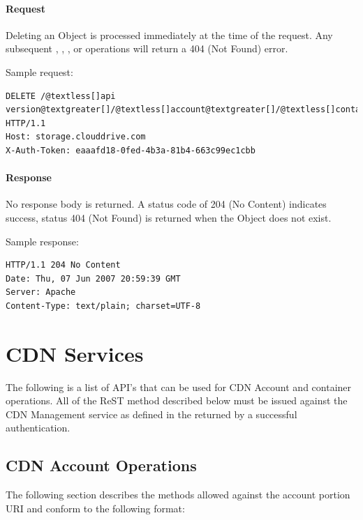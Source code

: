 \documentclass[letterpaper,10pt,english]{manual}
\begin{document}
\paragraph{Request}

Deleting an Object is processed immediately at the time of the request.
Any subsequent , , , or  operations will
return a 404 (Not Found) error.

Sample request:

\begin{Verbatim}[commandchars=@\[\]]
DELETE /@textless[]api version@textgreater[]/@textless[]account@textgreater[]/@textless[]container@textgreater[]/@textless[]object@textgreater[] HTTP/1.1
Host: storage.clouddrive.com
X-Auth-Token: eaaafd18-0fed-4b3a-81b4-663c99ec1cbb
\end{Verbatim}


\paragraph{Response}

No response body is returned. A status code of 204 (No Content) indicates
success, status 404 (Not Found) is returned when the Object does not
exist.

Sample response:

\begin{Verbatim}[commandchars=@\[\]]
HTTP/1.1 204 No Content
Date: Thu, 07 Jun 2007 20:59:39 GMT
Server: Apache
Content-Type: text/plain; charset=UTF-8
\end{Verbatim}


\section{CDN Services}

The following is a list of API's that can be used for CDN Account and
container operations.  All of the ReST method described below must be
issued against the CDN Management service as defined in the
 returned by a successful authentication.


\subsection{CDN Account Operations}

The following section describes the methods allowed against the account
portion URI and conform to the following format:
\end{document}
